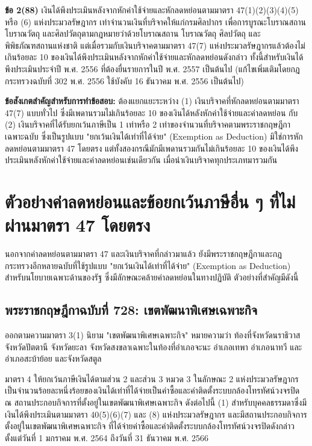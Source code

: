 \documentclass[12pt,a4paper]{article}
\newcommand{\hilight}[1]{\textbf{#1}}
\begin{document}
\textbf{ข้อ 2(88)} เงินได้พึงประเมินหลังจากหักค่าใช้จ่ายและหักลดหย่อนตามมาตรา 47(1)(2)(3)(4)(5) หรือ (6) แห่งประมวลรัษฎากร เท่าจำนวนเงินที่บริจาคให้แก่กรมศิลปากร เพื่อการบูรณะโบราณสถาน โบราณวัตถุ และศิลปวัตถุตามกฎหมายว่าด้วยโบราณสถาน โบราณวัตถุ ศิลปวัตถุ และพิพิธภัณฑสถานแห่งชาติ แต่เมื่อรวมกับเงินบริจาคตามมาตรา 47(7) แห่งประมวลรัษฎากรแล้วต้องไม่เกินร้อยละ 10 ของเงินได้พึงประเมินหลังจากหักค่าใช้จ่ายและหักลดหย่อนดังกล่าว ทั้งนี้สำหรับเงินได้พึงประเมินประจำปี พ.ศ. 2556 ที่ต้องยื่นรายการในปี พ.ศ. 2557 เป็นต้นไป (แก้ไขเพิ่มเติมโดยกฎกระทรวงฉบับที่ 302 พ.ศ. 2556 ใช้บังคับ 16 ธันวาคม พ.ศ. 2556 เป็นต้นไป)

\hilight{ข้อสังเกตสำคัญสำหรับการทำข้อสอบ:} ต้องแยกแยะระหว่าง (1) เงินบริจาคที่หักลดหย่อนตามมาตรา 47(7) แบบทั่วไป ซึ่งมีเพดานรวมไม่เกินร้อยละ 10 ของเงินได้หลังหักค่าใช้จ่ายและค่าลดหย่อน กับ (2) เงินบริจาคที่ได้รับยกเว้นภาษีเป็น 1 เท่าหรือ 2 เท่าของจำนวนที่บริจาคตามพระราชกฤษฎีกาเฉพาะฉบับ ซึ่งเป็นรูปแบบ "ยกเว้นเงินได้เท่าที่ได้จ่าย" (Exemption as Deduction) มิใช่การหักลดหย่อนตามมาตรา 47 โดยตรง แต่ทั้งสองกรณีมักมีเพดานรวมกันไม่เกินร้อยละ 10 ของเงินได้พึงประเมินหลังหักค่าใช้จ่ายและค่าลดหย่อนเช่นเดียวกัน เมื่อนำเงินบริจาคทุกประเภทมารวมกัน

\newpage
\section{ตัวอย่างค่าลดหย่อนและข้อยกเว้นภาษีอื่น ๆ ที่ไม่ผ่านมาตรา 47 โดยตรง}

นอกจากค่าลดหย่อนตามมาตรา 47 และเงินบริจาคที่กล่าวมาแล้ว ยังมีพระราชกฤษฎีกาและกฎกระทรวงอีกหลายฉบับที่ใช้รูปแบบ "ยกเว้นเงินได้เท่าที่ได้จ่าย" (Exemption as Deduction) สำหรับนโยบายเฉพาะด้านของรัฐ ซึ่งมีลักษณะคล้ายค่าลดหย่อนในทางปฏิบัติ ตัวอย่างที่สำคัญมีดังนี้

\subsection*{พระราชกฤษฎีกาฉบับที่ 728: เขตพัฒนาพิเศษเฉพาะกิจ}

ออกตามความมาตรา 3(1) นิยาม "เขตพัฒนาพิเศษเฉพาะกิจ" หมายความว่า ท้องที่จังหวัดนราธิวาส จังหวัดปัตตานี จังหวัดยะลา จังหวัดสงขลาเฉพาะในท้องที่อำเภอจะนะ อำเภอเทพา อำเภอนาทวี และอำเภอสะบ้าย้อย และจังหวัดสตูล

มาตรา 4 ให้ยกเว้นภาษีเงินได้ตามส่วน 2 และส่วน 3 หมวด 3 ในลักษณะ 2 แห่งประมวลรัษฎากร เป็นจำนวนร้อยละหนึ่งร้อยของเงินได้เท่าที่ได้จ่ายเป็นค่าซื้อและค่าติดตั้งระบบกล้องโทรทัศน์วงจรปิด ณ สถานประกอบกิจการที่ตั้งอยู่ในเขตพัฒนาพิเศษเฉพาะกิจ ดังต่อไปนี้ (1) สำหรับบุคคลธรรมดาซึ่งมีเงินได้พึงประเมินตามมาตรา 40(5)(6)(7) และ (8) แห่งประมวลรัษฎากร และมีสถานประกอบกิจการตั้งอยู่ในเขตพัฒนาพิเศษเฉพาะกิจ ที่ได้จ่ายค่าซื้อและค่าติดตั้งระบบกล้องโทรทัศน์วงจรปิดดังกล่าวตั้งแต่วันที่ 1 มกราคม พ.ศ. 2564 ถึงวันที่ 31 ธันวาคม พ.ศ. 2566
\end{document}
